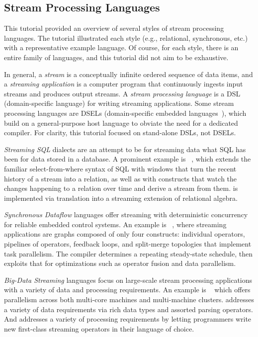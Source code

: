 \subsection{Stream Processing Languages}\label{sec:tut_lang}

This tutorial provided an overview of several styles of stream processing
languages. The tutorial illustrated each style (e.g., relational,
synchronous, etc.) with a representative example language. Of course,
for each style, there is an entire family of languages, and this
tutorial did not aim to be exhaustive.

In general, a \emph{stream} is a conceptually infinite ordered sequence of data
items, and a \emph{streaming application} is a computer program that
continuously ingests input streams and produces output streams.  A
\emph{stream processing language} is a DSL (domain-specific language)
for writing streaming applications. Some stream processing languages
are DSELs (do\-main-specific embedded languages~\cite{hudak_1998}),
which build on a general-purpose host language to obviate the need for
a dedicated compiler. For clarity, this tutorial focused on
stand-alone DSLs, not DSELs.

\emph{Streaming SQL} dialects are an attempt to be for streaming data
what SQL has been for data stored in a database. A prominent example
is ~\cite{arasu_babu_widom_2006}, which extends the familiar
select-from-where syntax of SQL with windows that turn the recent
history of a stream into a relation, as well as with constructs that
watch the changes happening to a relation over time and derive a
stream from them.  is implemented via translation into a streaming
extension of relational algebra.

\emph{Synchronous Dataflow} languages offer streaming with
deterministic concurrency for reliable embedded control systems. An
example is ~\cite{thies_et_al_2002}, where streaming
applications are graphs composed of only four constructs: individual
operators, pipe\-lines of operators, feedback loops, and split-merge
topologies that implement task parallelism. The  compiler
determines a repeating steady-state schedule, then exploits that for
optimizations such as operator fusion and data parallelism.

\emph{Big-Data Streaming} languages focus on large-scale stream
processing applications with a variety of data and processing
requirements. An example is ~\cite{hirzel_schneider_gedik_2017} which offers parallelism across both multi-core machines and
multi-machine clusters.  addresses a variety of data requirements
via rich data types and assorted parsing operators. And  addresses
a variety of processing requirements by letting programmers write new
first-class streaming operators in their language of choice.

